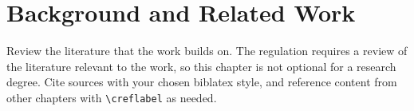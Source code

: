 \chapter{Background and Related Work}
Review the literature that the work builds on. The regulation requires a review of the literature relevant to the work, so this chapter is not optional for a research degree. Cite sources with your chosen biblatex style, and reference content from other chapters with \texttt{\textbackslash cref{label}} as needed.


